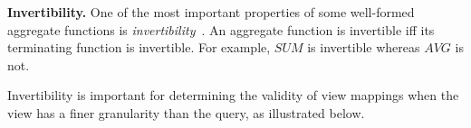 
\textbf{Invertibility.} 
One of the most important properties of some well-formed aggregate functions is {\em invertibility}~\cite{cohen2006user}. An aggregate function is invertible iff its terminating function is invertible.  For example, $SUM$ is invertible whereas $AVG$ is not.

Invertibility is important for determining the validity of view mappings when the view has a finer granularity than the query, as illustrated below.

